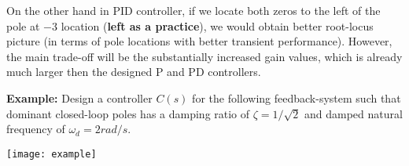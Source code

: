 \documentclass[twoside]{article}
\begin{document}
On the other hand in PID controller, if we locate both zeros to the
left of the pole at $-3$ location (\textbf{left as a practice}), we 
would obtain better root-locus picture (in terms of pole locations
 with better transient performance). However, the main trade-off will
be the substantially increased gain values, which is already much
larger then the designed P and PD controllers.

\vspace{12pt}

\textbf{Example:} Design a controller $C(s)$ for the following
feedback-system such that dominant closed-loop poles
has a damping ratio of $\zeta = 1/\sqrt{2}$ and damped natural
frequency of $\omega_d = 2 rad/s$.

\vspace{12 pt}

  \begin{minipage}[h]{1\linewidth}
    \begin{center}
      \texttt{[image: example]}
    \end{center}
  \end{minipage}

\vspace{12 pt}
\end{document}
